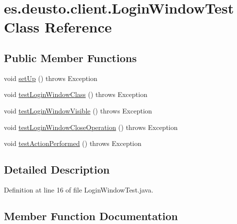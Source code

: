 \hypertarget{classes_1_1deusto_1_1client_1_1_login_window_test}{}\section{es.\+deusto.\+client.\+Login\+Window\+Test Class Reference}
\label{classes_1_1deusto_1_1client_1_1_login_window_test}
\subsection*{Public Member Functions}
\begin{DoxyCompactItemize}
\item 
void \hyperlink{classes_1_1deusto_1_1client_1_1_login_window_test_a933acf800aa9a00a3434d7e52d36cdc7}{set\+Up} ()  throws Exception 
\item 
void \hyperlink{classes_1_1deusto_1_1client_1_1_login_window_test_ac359eac8035197bd00b65f34d5e74c29}{test\+Login\+Window\+Class} ()  throws Exception 
\item 
void \hyperlink{classes_1_1deusto_1_1client_1_1_login_window_test_af3a9c3aab7052bc279bd98b5f34dc574}{test\+Login\+Window\+Visible} ()  throws Exception 
\item 
void \hyperlink{classes_1_1deusto_1_1client_1_1_login_window_test_a65a992d1184421c2aff6afaf3cedbe7c}{test\+Login\+Window\+Close\+Operation} ()  throws Exception 
\item 
void \hyperlink{classes_1_1deusto_1_1client_1_1_login_window_test_a404ca444c6d5f9e57ddd9999e4f0c982}{test\+Action\+Performed} ()  throws Exception 
\end{DoxyCompactItemize}


\subsection{Detailed Description}


Definition at line 16 of file Login\+Window\+Test.\+java.



\subsection{Member Function Documentation}
\mbox{\label{classes_1_1deusto_1_1client_1_1_login_window_test_a933acf800aa9a00a3434d7e52d36cdc7}} 
